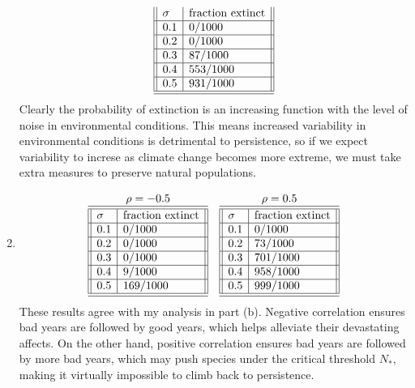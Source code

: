 \documentclass{article} %
\theoremstyle{plain}
\numberwithin{equation}{section} %
\numberwithin{figure}{section} %
\numberwithin{table}{section} %
\begin{document}
\begin{enumerate}[\ \ (a)]
\begin{align*}
\begin{array}{||l|l||}
                \sigma & \text{fraction extinct} \\\hline
                0.1 & 0/1000 \\\hline
                0.2 & 0/1000 \\\hline
                0.3 & 87/1000 \\\hline
                0.4 & 553/1000 \\\hline
                0.5 & 931/1000 \\\hline\hline
            \end{array}
        \end{align*}
        Clearly the probability of extinction is an increasing function with the level of noise in environmental conditions.  This means increased variability in environmental conditions is detrimental to persistence, so if we expect variability to increse as climate change becomes more extreme, we must take extra measures to preserve natural populations.
    \item
        \begin{align*}
            \begin{array}{cc}
                \rho = -0.5 & \rho = 0.5 \\
                \begin{array}{||l|l||}\hline\hline
                    \sigma & \text{fraction extinct} \\\hline
                    0.1 & 0/1000 \\\hline
                    0.2 & 0/1000 \\\hline
                    0.3 & 0/1000 \\\hline
                    0.4 & 9/1000 \\\hline
                    0.5 & 169/1000 \\\hline\hline
                \end{array} & \begin{array}{||l|l||}\hline\hline
                    \sigma & \text{fraction extinct} \\\hline
                    0.1 & 0/1000 \\\hline
                    0.2 & 73/1000 \\\hline
                    0.3 & 701/1000 \\\hline
                    0.4 & 958/1000 \\\hline
                    0.5 & 999/1000 \\\hline\hline
                \end{array}
            \end{array}
        \end{align*}
        These results agree with my analysis in part (b).  Negative correlation ensures bad years are followed by good years, which helps alleviate their devastating affects.  On the other hand, positive correlation ensures bad years are followed by more bad years, which may push species under the critical threshold $N_*$, making it virtually impossible to climb back to persistence.
\end{enumerate}
\end{document}
